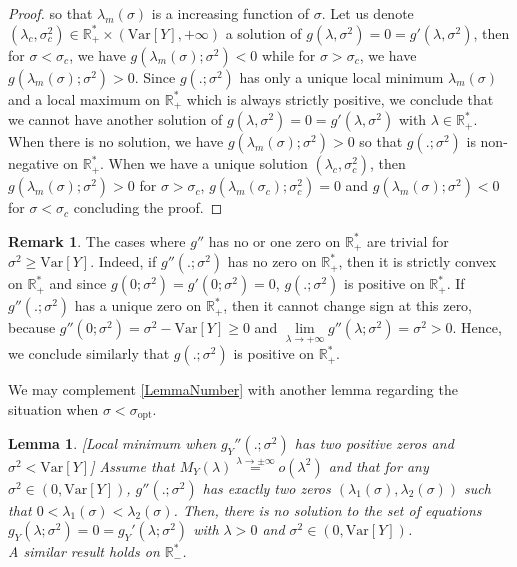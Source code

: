 \documentclass[a4paper, 10pt]{article}
\newtheorem{lemma}{Lemma}[section]
\theoremstyle{definition}
\newtheorem{remark}{Remark}[section]
\begin{document}
\begin{proof}
so that $\lambda_m(\sigma)$ is a increasing function of $\sigma$. Let us denote $(\lambda_c,\sigma_c^2)\in \mathbb{R}_+^*\times \left(\text{Var}[Y],+\infty\right)$ a solution of $g(\lambda,\sigma^2)=0=g'(\lambda,\sigma^2)$, then for $\sigma<\sigma_c$, we have $g(\lambda_m(\sigma);\sigma^2)<0$ while for $\sigma>\sigma_c$, we have $g(\lambda_m(\sigma);\sigma^2)>0$. Since $g(.;\sigma^2)$ has only a unique local minimum $\lambda_m(\sigma)$ and a local maximum on $\mathbb{R}_+^*$ which is always strictly positive, we conclude that we cannot have another solution of $g(\lambda,\sigma^2)=0=g'(\lambda,\sigma^2)$ with $\lambda\in \mathbb{R}_+^*$. When there is no solution, we have $g(\lambda_m(\sigma);\sigma^2)>0$ so that $g(.;\sigma^2)$ is non-negative on $\mathbb{R}_+^*$. When we have a unique solution $(\lambda_c,\sigma_c^2)$, then $g(\lambda_m(\sigma);\sigma^2)>0$ for $\sigma>\sigma_c$, $g(\lambda_m(\sigma_c);\sigma_c^2)=0$ and $g(\lambda_m(\sigma);\sigma^2)<0$ for $\sigma<\sigma_c$ concluding the proof. 
\end{proof}

\begin{remark} The cases where $g''$ has no or one zero on $\mathbb{R}_+^*$ are trivial for $\sigma^2\geq \text{Var}[Y]$. Indeed, if $g''(.;\sigma^2)$ has no zero on $\mathbb{R}_+^*$, then it is strictly convex on $\mathbb{R}_+^*$ and since $g(0;\sigma^2)=g'(0;\sigma^2)=0$, $g(.;\sigma^2)$ is positive on $\mathbb{R}_+^*$. If $g''(.;\sigma^2)$ has a unique zero on $\mathbb{R}_+^*$, then it cannot change sign at this zero, because $g''(0;\sigma^2)=\sigma^2-\text{Var}[Y]\geq 0$ and $\underset{\lambda\to +\infty}{\lim}g''(\lambda;\sigma^2)=\sigma^2>0$. Hence, we conclude similarly that $g(.;\sigma^2)$ is positive on $\mathbb{R}_+^*$. 
\end{remark}

We may complement \autoref{LemmaNumber} with another lemma regarding the situation when $\sigma<\sigma_{\text{opt}}$.

\begin{lemma}\label{LemmaNumber2}[Local minimum when $g_Y''(.;\sigma^2)$ has two positive zeros and $\sigma^2<\text{Var}[Y]$]
Assume that $M_Y(\lambda)\overset{\lambda\to \pm\infty}{=}o(\lambda^2)$ and that for any $\sigma^2\in \left(0,\text{Var}[Y]\right)$, $g''(.;\sigma^2)$ has exactly two zeros $(\lambda_1(\sigma),\lambda_2(\sigma))$ such that $0<\lambda_1(\sigma)<\lambda_2(\sigma)$. Then, there is no solution to the set of equations $g_Y(\lambda;\sigma^2)=0=g_Y'(\lambda;\sigma^2)$ with $\lambda>0$ and $\sigma^2\in \left(0,\text{Var}[Y]\right)$.\\
A similar result holds on $\mathbb{R}_-^*$.
\end{lemma}
\end{document}
